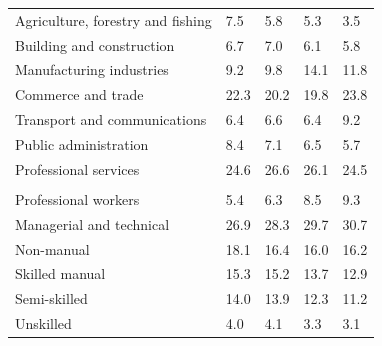 \documentclass{article}
\begin{document}
\begin{table}[h]
\begin{tabular}{KTTTT}
    \hline
Agriculture, forestry and fishing  & 7.5& 5.8& 5.3& 3.5\\
Building and construction & 6.7& 7.0& 6.1& 5.8\\
Manufacturing industries &  9.2&  9.8& 14.1& 11.8\\
Commerce and trade  & 22.3& 20.2& 19.8& 23.8\\
Transport and communications  & 6.4& 6.6& 6.4& 9.2\\
Public administration & 8.4& 7.1& 6.5& 5.7\\
Professional services & 24.6& 26.6& 26.1& 24.5\\
\hline
    \\ 
    \hline
Professional workers  & 5.4& 6.3 & 8.5& 9.3\\
Managerial and technical & 26.9& 28.3& 29.7& 30.7\\
Non-manual & 18.1& 16.4& 16.0& 16.2\\
Skilled manual & 15.3& 15.2& 13.7& 12.9\\
Semi-skilled & 14.0& 13.9& 12.3& 11.2\\
Unskilled  & 4.0& 4.1& 3.3& 3.1\\
\end{tabular}
\end{table}
\pagebreak
\end{document}
